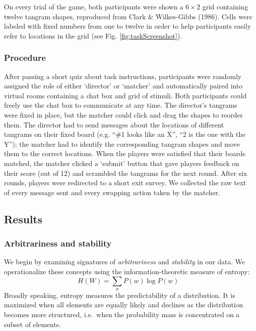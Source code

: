 \documentclass[alpha-refs]{wiley-article}
\begin{document}
On every trial of the game, both participants were shown a
\(6 \times 2\) grid containing twelve tangram shapes, reproduced from
Clark \& Wilkes-Gibbs (1986). Cells were labeled with fixed numbers from
one to twelve in order to help participants easily refer to locations in
the grid (see Fig. \ref{fig:taskScreenshot}).

\subsubsection{Procedure}\label{procedure}

After passing a short quiz about task instructions, participants were
randomly assigned the role of either `director' or `matcher' and
automatically paired into virtual rooms containing a chat box and grid
of stimuli. Both participants could freely use the chat box to
communicate at any time. The director's tangrams were fixed in place,
but the matcher could click and drag the shapes to reorder them. The
director had to send messages about the locations of different tangrams
on their fixed board (e.g. ``\#1 looks like an X'', ``2 is the one with
the Y''); the matcher had to identify the corresponding tangram shapes
and move them to the correct locations. When the players were satisfied
that their boards matched, the matcher clicked a `submit' button that
gave players feedback on their score (out of 12) and scrambled the
tangrams for the next round. After six rounds, players were redirected
to a short exit survey. We collected the raw text of every message sent
and every swapping action taken by the matcher.

\begin{figure}

\end{figure}

\subsection{Results}\label{results}

\subsubsection{Arbitrariness and
stability}\label{arbitrariness-and-stability}

We begin by examining signatures of \emph{arbitrariness} and
\emph{stability} in our data. We operationalize these concepts using the
information-theoretic measure of entropy:
\[H(W) = \sum_w P(w) \log P(w)\] Broadly speaking, entropy measures the
predictability of a distribution. It is maximized when all elements are
equally likely and declines as the distribution becomes more structured,
i.e.~when the probability mass is concentrated on a subset of elements.
\end{document}
